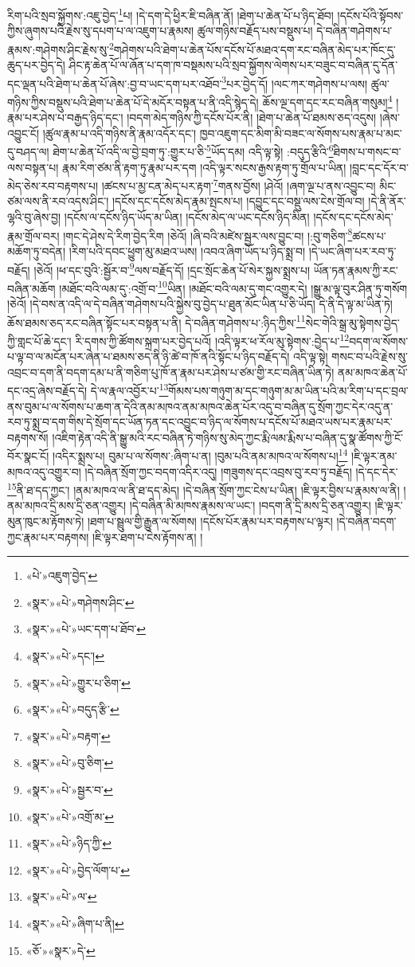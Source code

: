 རིག་པའི་སྲབ་སྐྱོགས་:འཇུ་བྱེད་\footnote{«པེ་»འཇུག་བྱེད་}པ། །དེ་དག་དེ་ཕྱིར་ཇི་བཞིན་ནོ། །ཐེག་པ་ཆེན་པོ་པ་ཉིད་ཐོབ། །དངོས་པོའི་སྟོབས་ཀྱིས་ཞུགས་པའི་རྗེས་སུ་དཔག་པ་ལ་འཇུག་པ་རྣམས། ཚུལ་གཉིས་བརྗོད་པས་བསྡུས་པ། དེ་བཞིན་གཤེགས་པ་རྣམས་:གཤེགས་ཤིང་རྗེས་སུ་\footnote{«སྣར་»«པེ་»གཤེགས་ཤིང་}གཤེགས་པའི་ཐེག་པ་ཆེན་པོས་དངོས་པོ་མཐའ་དག་རང་བཞིན་མེད་པར་ཁོང་དུ་ཆུད་པར་བྱེད་དེ། ཤིང་རྟ་ཆེན་པོ་ལ་ཞོན་པ་དག་ཁ་བསྡམས་པའི་སྲབ་སྐྱོགས་ལེགས་པར་བཟུང་བ་བཞིན་དུ་དོན་དང་ལྡན་པའི་ཐེག་པ་ཆེན་པོ་ཞེས་:བྱ་བ་ཡང་དག་པར་འཐོབ་\footnote{«སྣར་»«པེ་»ཡང་དག་པ་ཐོབ་}པར་བྱེད་དོ། །ལང་ཀར་གཤེགས་པ་ལས། ཚུལ་གཉིས་ཀྱིས་བསྡུས་པའི་ཐེག་པ་ཆེན་པོ་དེ་མདོར་བསྟན་པ་ནི་འདི་སྙེད་དེ། ཆོས་ལྔ་དག་དང་རང་བཞིན་གསུམ།\footnote{«སྣར་»«པེ་»དང་།} །རྣམ་པར་ཤེས་པ་བརྒྱད་ཉིད་དང་། །བདག་མེད་གཉིས་ཀྱི་དངོས་པོར་ནི། །ཐེག་པ་ཆེན་པོ་ཐམས་ཅད་འདུས། །ཞེས་འབྱུང་ངོ། །ཚུལ་རྣམ་པ་འདི་གཉིས་ནི་རྣམ་འདོར་དང་། ཁྱབ་འཇུག་དང་མིག་མི་བཟང་ལ་སོགས་པས་རྣམ་པ་མང་དུ་བཤད་ལ། ཐེག་པ་ཆེན་པོ་འདི་ལ་བྱེ་བྲག་ཏུ་:གྱུར་པ་ཅི་\footnote{«སྣར་»«པེ་»གྱུར་པ་ཅིག་}ཡོད་དམ། འདི་ལྟ་སྟེ། :བདུད་རྩིའི་\footnote{«སྣར་»«པེ་»བདུད་རྩི་}ཐིགས་པ་གསང་བ་ལས་བསྟན་པ། རྣམ་རིག་ཙམ་ནི་རྟག་ཏུ་རྣམ་པར་དག །འདི་ལྟར་སངས་རྒྱས་རྟག་ཏུ་གྲོལ་པ་ཡིན། །བླང་དང་དོར་བ་མེད་ཅེས་རབ་བརྟགས་པ། །ཚངས་པ་མྱ་ངན་མེད་པར་རྟག་\footnote{«སྣར་»«པེ་»བརྟག་}གནས་བྱོས། །ཤེའོ། །ཞག་ལྔ་པ་ནས་འབྱུང་བ། མིང་ཙམ་ལས་ནི་རབ་འདས་ཤིང་། །དངོས་དང་དངོས་མེད་རྣམ་སྤངས་པ། །དབྱུང་དང་བསྡུ་ལས་ངེས་གྲོལ་བ། །དེ་ནི་ནོར་ལྷའི་བུ་ཞེས་བྱ། །དངོས་ལ་དངོས་ཉིད་ཡོད་མ་ཡིན། །དངོས་མེད་ལ་ཡང་དངོས་ཉིད་མིན། །དངོས་དང་དངོས་མེད་རྣམ་གྲོལ་བར། །གང་དེ་ཤེས་དེ་རིག་བྱེད་རིག །ཅེའོ། །ཞི་བའི་མཛེས་སྦྱར་ལས་བྱུང་བ། །:བུ་གཅིག་\footnote{«སྣར་»«པེ་»བུ་ཅིག་}ཚངས་པ་མཆོག་ཏུ་བདེན། །རིག་པའི་དབང་ཕྱུག་མུ་མཐའ་ཡས། །འབའ་ཞིག་ཡོད་པ་ཉིད་སྨྲ་བ། །དེ་ཡང་ཞིག་པར་རབ་ཏུ་བརྗོད། །ཅེའོ། །ཕ་དང་བུའི་:སྦྱོར་བ་\footnote{«སྣར་»«པེ་»སྦྱར་བ་}ལས་བརྗོད་དོ། །དྲང་སྲོང་ཆེན་པོ་སེར་སྐྱས་སྨྲས་པ། ཡོན་ཏན་རྣམས་ཀྱི་རང་བཞིན་མཆོག །མཐོང་བའི་ལམ་དུ་:འགྲོ་བ་\footnote{«སྣར་»«པེ་»འགྲོ་མ་}ཡིན། །མཐོང་བའི་ལམ་དུ་གང་འགྱུར་དེ། །སྒྱུ་མ་ལྟ་བུར་ཤིན་ཏུ་གསོག །ཅེའོ། །དེ་བས་ན་འདི་ལ་དེ་བཞིན་གཤེགས་པའི་སྐྱེས་བུ་བྱེད་པ་ཐུན་མོང་ཡིན་པ་ཅི་ཡོད། དེ་ནི་དེ་ལྟ་མ་ཡིན་ཏེ། ཆོས་ཐམས་ཅད་རང་བཞིན་སྟོང་པར་བསྟན་པ་ནི། དེ་བཞིན་གཤེགས་པ་:ཉིད་ཀྱིས་\footnote{«སྣར་»«པེ་»ཉིད་ཀྱི་}སེང་གེའི་སྒྲ་མུ་སྟེགས་བྱེད་ཀྱི་གླང་པོ་ཆེ་དང་། རི་དགས་ཀྱི་ཚོགས་སྐྲག་པར་བྱེད་པའོ། །འདི་ལྟར་ཕ་རོལ་མུ་སྟེགས་:བྱེད་པ་\footnote{«སྣར་»«པེ་»བྱེད་ལོག་པ་}བདག་ལ་སོགས་པ་ལྟ་བ་ལ་མངོན་པར་ཞེན་པ་ཐམས་ཅད་ནི་ཉི་ཚེ་བ་ཁོ་ནའི་སྟོང་པ་ཉིད་བརྗོད་དེ། འདི་ལྟ་སྟེ། གསང་བ་པའི་རྗེས་སུ་འབྲང་བ་དག་ནི་བདག་དམ་པ་ནི་གཅིག་པུ་ཁོ་ན་རྣམ་པར་ཤེས་པ་ཙམ་གྱི་རང་བཞིན་ཡིན་ཏེ། ནམ་མཁའ་ཆེན་པོ་དང་འདྲ་ཞེས་བརྗོད་དེ། དེ་ལ་རྣལ་འབྱོར་པ་\footnote{«སྣར་»«པེ་»ལ་}གོམས་པས་གཉུག་མ་དང་གཉུག་མ་མ་ཡིན་པའི་མ་རིག་པ་དང་བྲལ་ནས་བུམ་པ་ལ་སོགས་པ་ཆག་ན་དེའི་ནམ་མཁའ་ནམ་མཁའ་ཆེན་པོར་འདུ་བ་བཞིན་དུ་སྲོག་ཀྱང་དེར་འདུ་ན་རབ་ཏུ་སྨྲ་བ་དག་གིས་དེ་སྲོག་དང་ཡོན་ཏན་དང་འབྱུང་བ་ཉིད་ལ་སོགས་པ་དངོས་པོ་མཐའ་ཡས་པར་རྣམ་པར་བརྟགས་སོ། །འཇིག་རྟེན་འདི་ནི་སྒྱུ་མའི་རང་བཞིན་ཏེ་གཉིས་སུ་མེད་ཀྱང་རྨི་ལམ་རྨིས་པ་བཞིན་དུ་སྣ་ཚོགས་ཀྱི་ངོ་བོར་སྣང་ངོ། །འདིར་སྨྲས་པ། བུམ་པ་ལ་སོགས་:ཞིག་པ་ན། །བུམ་པའི་ནམ་མཁའ་ལ་སོགས་པ།\footnote{«སྣར་»«པེ་»ཞིག་པ་ནི།} །ཇི་ལྟར་ནམ་མཁའ་འདུ་འགྱུར་བ། །དེ་བཞིན་སྲོག་ཀྱང་བདག་འདིར་འདུ། །གཟུགས་དང་འབྲས་བུ་རབ་ཏུ་བརྗོད། །དེ་དང་དེར་\footnote{«ཅོ་»«སྣར་»དེ་}ནི་ཐ་དད་ཀྱང་། །ནམ་མཁའ་ལ་ནི་ཐ་དད་མེད། །དེ་བཞིན་སྲོག་ཀྱང་ངེས་པ་ཡིན། །ཇི་ལྟར་བྱིས་པ་རྣམས་ལ་ནི། །ནམ་མཁའ་དྲི་མས་དྲི་ཅན་འགྱུར། །དེ་བཞིན་མི་མཁས་རྣམས་ལ་ཡང་། །བདག་ནི་དྲི་མས་དྲི་ཅན་འགྱུར། །ཇི་ལྟར་མུན་ཁུང་མ་རྟོགས་ཏེ། །ཐག་པ་སྦྲུལ་གྱི་རྒྱུན་ལ་སོགས། །དངོས་པོར་རྣམ་པར་བརྟགས་པ་ལྟར། །དེ་བཞིན་བདག་ཀྱང་རྣམ་པར་བརྟགས། །ཇི་ལྟར་ཐག་པ་ངེས་རྟོགས་ན། །
